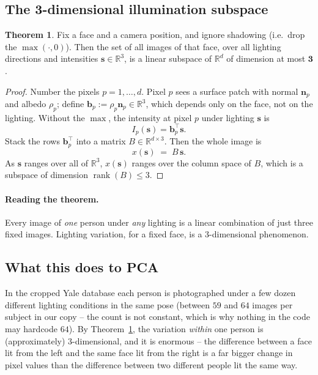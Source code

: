 \documentclass[11pt]{article}
\theoremstyle{definition}
\newtheorem{theorem}{Theorem}[section]
\theoremstyle{remark}
\newcommand{\R}{\mathbb{R}}
\newcommand{\rank}{\operatorname{rank}}
\begin{document}
\subsection{The 3-dimensional illumination subspace}

\begin{theorem}\label{thm:cone}
Fix a face and a camera position, and ignore shadowing (i.e.\ drop the
$\max(\cdot,0)$). Then the set of all images of that face, over all lighting
directions and intensities $\mathbf{s}\in\R^3$, is a linear subspace of $\R^d$ of
dimension at most $\mathbf{3}$.
\end{theorem}

\begin{proof}
Number the pixels $p=1,\dots,d$. Pixel $p$ sees a surface patch with normal
$\mathbf{n}_p$ and albedo $\rho_p$; define $\mathbf{b}_p := \rho_p\mathbf{n}_p \in \R^3$, which
depends only on the face, not on the lighting. Without the $\max$, the intensity at
pixel $p$ under lighting $\mathbf{s}$ is
\[
  I_p(\mathbf{s}) = \mathbf{b}_p^{\!\top}\mathbf{s}.
\]
Stack the rows $\mathbf{b}_p^{\!\top}$ into a matrix $B\in\R^{d\times 3}$. Then the whole
image is
\[
  x(\mathbf{s}) \;=\; B\,\mathbf{s}.
\]
As $\mathbf{s}$ ranges over all of $\R^3$, $x(\mathbf{s})$ ranges over the column
space of $B$, which is a subspace of dimension $\rank(B)\le 3$.
\end{proof}

\paragraph{Reading the theorem.} Every image of \emph{one} person under \emph{any}
lighting is a linear combination of just three fixed images. Lighting variation,
for a fixed face, is a 3-dimensional phenomenon.

\subsection{What this does to PCA}

In the cropped Yale database each person is photographed under a few dozen
different lighting conditions in the same pose (between $59$ and $64$ images per
subject in our copy -- the count is not constant, which is why nothing in the
code may hardcode $64$). By Theorem~\ref{thm:cone}, the variation \emph{within}
one person is (approximately) 3-dimensional, and it is enormous -- the difference
between a face lit from the left and the same face lit from the right is a far
bigger change in pixel values than the difference between two different people lit
the same way.
\end{document}

